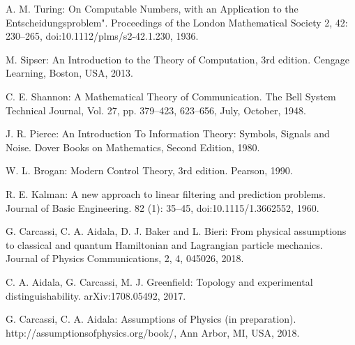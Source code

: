 \documentclass[letterpaper]{article}
\theoremstyle{plain}%
\theoremstyle{definition}
\theoremstyle{remark}
\begin{document}
\begin{thebibliography}{1}
	
	A. M. Turing: On Computable Numbers, with an Application to the Entscheidungsproblem". Proceedings of the London Mathematical Society 2, 42: 230–265, doi:10.1112/plms/s2-42.1.230, 1936. 
	
	 M. Sipser: An Introduction to the Theory of Computation, 3rd edition. Cengage Learning, Boston, USA, 2013.
	
	 C. E. Shannon: A Mathematical Theory of Communication. The Bell System Technical Journal,
	Vol. 27, pp. 379–423, 623–656, July, October, 1948.
	
	 J. R. Pierce: An Introduction To Information Theory: Symbols, Signals and Noise. Dover Books on Mathematics, Second Edition, 1980.
	
	 W. L. Brogan: Modern Control Theory, 3rd edition. Pearson, 1990. 	
	
	 R. E. Kalman: A new approach to linear filtering and prediction problems. Journal of Basic Engineering. 82 (1): 35–45, doi:10.1115/1.3662552, 1960.
	
	 G. Carcassi, C. A. Aidala, D. J. Baker and L. Bieri: From physical assumptions to classical and quantum Hamiltonian and Lagrangian particle mechanics. Journal of Physics Communications, 2, 4, 045026, 2018.
	
	 C. A. Aidala, G. Carcassi, M. J. Greenfield: Topology and experimental distinguishability. arXiv:1708.05492, 2017.
	
	 G. Carcassi, C. A. Aidala: Assumptions of Physics (in preparation). http://assumptionsofphysics.org/book/, Ann Arbor, MI, USA, 2018.
\end{thebibliography}
\end{document}
